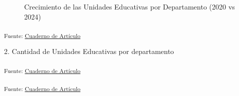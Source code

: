 \documentclass[
  12pt]{article}
\begin{document}
\begin{figure}[H]


\caption{\label{fig-crec2024}Crecimiento de las Unidades Educativas por
Departamento (2020 vs 2024)}

\end{figure}%

\textsubscript{Fuente: \href{sociest.org/index.ipynb.html}{Cuaderno de
Artículo}}

2. Cantidad de Unidades Educativas por departamento

\textsubscript{Fuente: \href{sociest.org/index.ipynb.html}{Cuaderno de
Artículo}}

\textsubscript{Fuente: \href{sociest.org/index.ipynb.html}{Cuaderno de
Artículo}}
\end{document}
